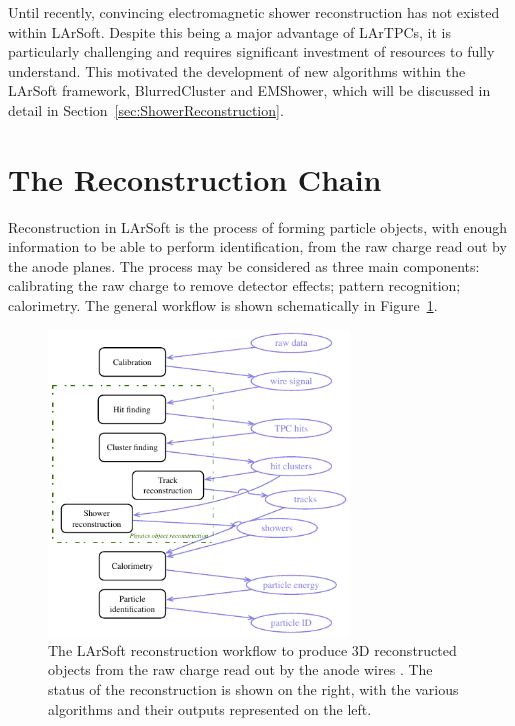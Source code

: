 Until recently, convincing electromagnetic shower reconstruction has not existed within LArSoft.  Despite this being a major advantage of LArTPCs, it is particularly challenging and requires significant investment of resources to fully understand.  This motivated the development of new algorithms within the LArSoft framework, BlurredCluster and EMShower, which will be discussed in detail in Section~\ref{sec:ShowerReconstruction}.

\section{The Reconstruction Chain}\label{sec:ReconstructionChain}

Reconstruction in LArSoft is the process of forming particle objects, with enough information to be able to perform identification, from the raw charge read out by the anode planes.  The process may be considered as three main components: calibrating the raw charge to remove detector effects; pattern recognition; calorimetry.  The general workflow is shown schematically in Figure~\ref{fig:ReconstructionWorkflow}.

\begin{figure}
  \centering
  \includegraphics[width=8cm]{ReconstructionWorkflow.pdf}
  \caption[The LArSoft reconstruction workflow to produce 3D reconstructed objects from the raw charge read out by the anode wires.]{The LArSoft reconstruction workflow to produce 3D reconstructed objects from the raw charge read out by the anode wires \cite{LArSoft2016}.  The status of the reconstruction is shown on the right, with the various algorithms and their outputs represented on the left.}
  \label{fig:ReconstructionWorkflow}
\end{figure}

